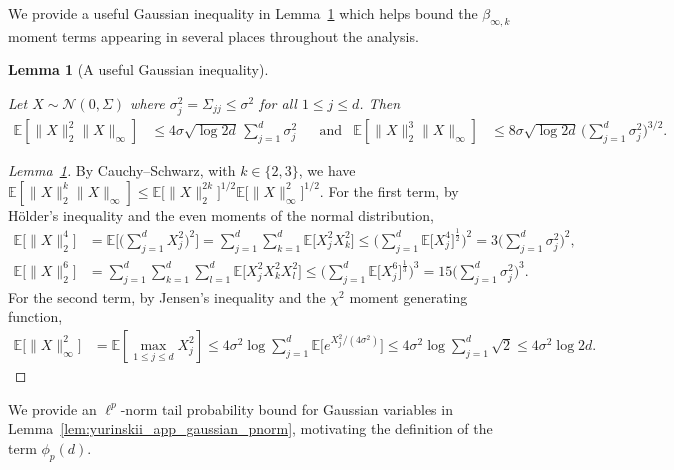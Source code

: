 \documentclass[11pt,lof]{puthesis}
\newcommand{\E}{\ensuremath{\mathbb{E}}}
\newcommand{\cN}{\ensuremath{\mathcal{N}}}
\theoremstyle{break}
\newtheorem{lemma}{Lemma}[section]
\theoremstyle{proof}
\newtheorem{proof}{Proof}
\begin{document}
We provide a useful Gaussian inequality in
Lemma~\ref{lem:yurinskii_app_gaussian_useful}
which helps bound the $\beta_{\infty,k}$ moment terms appearing in several
places throughout the analysis.

\begin{lemma}[A useful Gaussian inequality]%
\label{lem:yurinskii_app_gaussian_useful}

Let $X \sim \cN(0, \Sigma)$
where $\sigma_j^2 = \Sigma_{j j} \leq \sigma^2$ for all $1 \leq j \leq d$.
Then
%
\begin{align*}
\E\left[
\|X\|_2^2
\|X\|_\infty
\right]
&\leq
4 \sigma \sqrt{\log 2d}
\,\sum_{j=1}^d \sigma_j^2
&&\text{and}
&\E\left[
\|X\|_2^3
\|X\|_\infty
\right]
&\leq
8 \sigma \sqrt{\log 2d}
\,\bigg( \sum_{j=1}^d \sigma_j^2 \bigg)^{3/2}.
\end{align*}
%
\end{lemma}

\begin{proof}[Lemma~\ref{lem:yurinskii_app_gaussian_useful}]

By Cauchy--Schwarz, with $k \in \{2,3\}$, we have
$\E\left[\|X\|_2^{k} \|X\|_\infty \right]
\leq \E\big[\|X\|_2^{2k} \big]^{1/2} \E\big[\|X\|_\infty^2 \big]^{1/2}$.
For the first term, by H{\"o}lder's inequality and the even
moments of the normal distribution,
%
\begin{align*}
\E\big[\|X\|_2^4 \big]
&=
\E\Bigg[
\bigg(
\sum_{j=1}^d X_j^2
\bigg)^2
\Bigg]
=
\sum_{j=1}^d \sum_{k=1}^d
\E\big[
X_j^2 X_k^2
\big]
\leq
\bigg(
\sum_{j=1}^d
\E\big[X_j^4 \big]^{\frac{1}{2}}
\bigg)^2
=
3 \bigg(
\sum_{j=1}^d
\sigma_j^2
\bigg)^2, \\
\E\big[\|X\|_2^6 \big]
&=
\sum_{j=1}^d \sum_{k=1}^d \sum_{l=1}^d
\E\big[
X_j^2 X_k^2 X_l^2
\big]
\leq
\bigg(
\sum_{j=1}^d
\E\big[X_j^6 \big]^{\frac{1}{3}}
\bigg)^3
=
15 \bigg(
\sum_{j=1}^d
\sigma_j^2
\bigg)^3.
\end{align*}
%
For the second term, by Jensen's inequality and the $\chi^2$ moment
generating function,
%
\begin{align*}
\E\big[\|X\|_\infty^2 \big]
&=
\E\left[
\max_{1 \leq j \leq d}
X_j^2
\right]
\leq
4 \sigma^2
\log
\sum_{j=1}^d
\E\Big[
e^{X_j^2 / (4\sigma^2)}
\Big]
\leq
4 \sigma^2
\log
\sum_{j=1}^d
\sqrt{2}
\leq
4 \sigma^2
\log 2 d.
\end{align*}
%
\end{proof}

We provide an $\ell^p$-norm tail probability bound for Gaussian variables in
Lemma~\ref{lem:yurinskii_app_gaussian_pnorm}, motivating the definition of the
term
$\phi_p(d)$.
\end{document}
